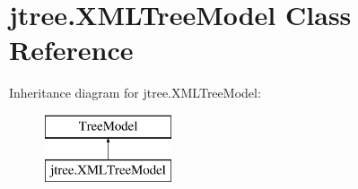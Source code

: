 \hypertarget{classjtree_1_1_x_m_l_tree_model}{\section{jtree.\+X\+M\+L\+Tree\+Model Class Reference}
\label{classjtree_1_1_x_m_l_tree_model}
}
Inheritance diagram for jtree.\+X\+M\+L\+Tree\+Model\+:\begin{figure}[H]
\begin{center}
\leavevmode
\includegraphics[height=2.000000cm]{classjtree_1_1_x_m_l_tree_model}
\end{center}
\end{figure}
